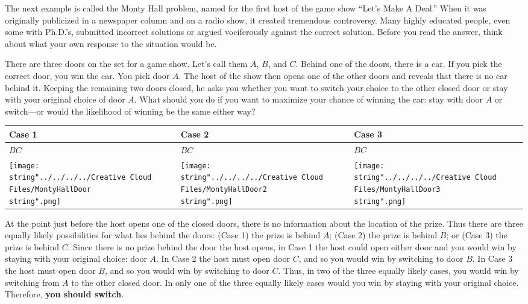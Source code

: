 \documentclass[11pt,a4paper]{book}
\begin{document}
The next example is called the Monty Hall problem, named for the first
host of the game show \textquotedblleft Let\textquoteright s Make
A Deal.\textquotedblright{} When it was originally publicized in a
newspaper column and on a radio show, it created tremendous controversy.
Many highly educated people, even some with Ph.D.\textquoteright s,
submitted incorrect solutions or argued vociferously against the correct
solution. Before you read the answer, think about what your own response
to the situation would be.

\begin{example}

There are three doors on the set for a game show. Let\textquoteright s
call them $A$, $B$, and $C$. Behind one of the doors, there is
a car. If you pick the correct door, you win the car. You pick door
$A$. The host of the show then opens one of the other doors and reveals
that there is no car behind it. Keeping the remaining two doors closed,
he asks you whether you want to switch your choice to the other closed
door or stay with your original choice of door $A$. What should you
do if you want to maximize your chance of winning the car: stay with
door $A$ or switch---or would the likelihood of winning be the same
either way?

\Solution

\begin{center}
\setlength{\extrarowheight}{2pt}%
\begin{tabular}{|>{\centering}p{4cm}|>{\centering}p{4cm}|>{\centering}p{4cm}|}
\hline
Case 1 & Case 2 & Case 3\tabularnewline
\hline
$B$\hspace{1.3cm}$C$ & $B$\hspace{1.3cm}$C$ & $B$\hspace{1.3cm}$C$\tabularnewline
\texttt{[image: \\string"../../../../Creative Cloud Files/MontyHallDoor\\string".png]} & \texttt{[image: \\string"../../../../Creative Cloud Files/MontyHallDoor2\\string".png]} & \texttt{[image: \\string"../../../../Creative Cloud Files/MontyHallDoor3\\string".png]}\tabularnewline
\hline
\end{tabular}
\par\end{center}

At the point just before the host opens one of the closed doors, there
is no information about the location of the prize. Thus there are
three equally likely possibilities for what lies behind the doors:
(Case 1) the prize is behind $A$; (Case 2) the prize is behind $B$;
or (Case 3) the prize is behind $C$. Since there is no prize behind
the door the host opens, in Case 1 the host could open either door
and you would win by staying with your original choice: door $A$.
In Case 2 the host must open door $C$, and so you would win by switching
to door $B$. In Case 3 the host must open door $B$, and so you would
win by switching to door $C$. Thus, in two of the three equally likely
cases, you would win by switching from $A$ to the other closed door.
In only one of the three equally likely cases would you win by staying
with your original choice. Therefore, \textbf{you should switch}.
\end{example}
\end{document}
